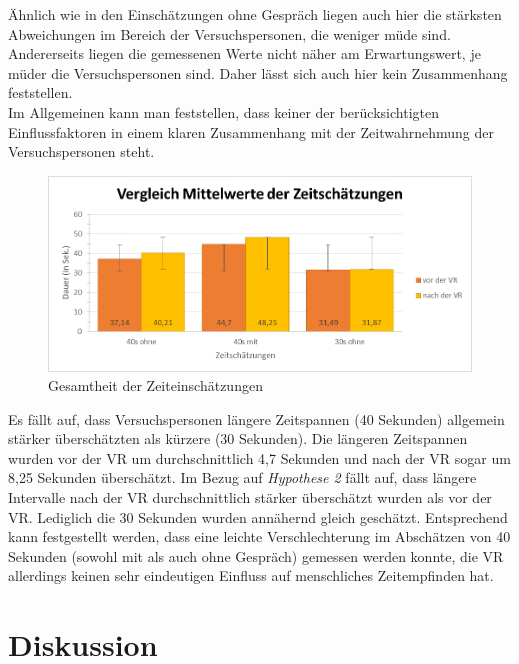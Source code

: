 \documentclass{Paper}
\begin{document}
Ähnlich wie in den Einschätzungen ohne Gespräch liegen auch hier die stärksten Abweichungen im Bereich der Versuchspersonen, die weniger müde sind. Andererseits liegen die gemessenen Werte nicht näher am Erwartungswert, je müder die Versuchspersonen sind. Daher lässt sich auch hier kein Zusammenhang feststellen.\\
Im Allgemeinen kann man feststellen, dass keiner der berücksichtigten Einflussfaktoren in einem klaren Zusammenhang mit der Zeitwahrnehmung der Versuchspersonen steht.




\begin{figure}[H]
	\centering
	\includegraphics[scale=0.7]{../Diagramme/zeitschaetzungen/vergleich.png}
	\caption{Gesamtheit der Zeiteinschätzungen}
	\label{zeiteinschaetzungen}
\end{figure}


Es fällt auf, dass Versuchspersonen längere Zeitspannen (40 Sekunden) allgemein stärker überschätzten als kürzere (30 Sekunden). Die längeren Zeitspannen wurden vor der VR um durchschnittlich 4,7 Sekunden und nach der VR sogar um 8,25 Sekunden überschätzt.
Im Bezug auf \textit{Hypothese 2} fällt auf, dass längere Intervalle nach der VR durchschnittlich stärker überschätzt wurden als vor der VR. Lediglich die 30 Sekunden wurden annähernd gleich geschätzt. Entsprechend kann festgestellt werden, dass  eine leichte Verschlechterung im Abschätzen von 40 Sekunden (sowohl mit als auch ohne Gespräch) gemessen werden konnte, die VR allerdings keinen sehr eindeutigen Einfluss auf menschliches Zeitempfinden hat.

       



\section{Diskussion}
\end{document}
